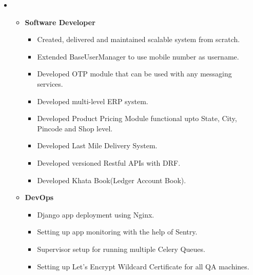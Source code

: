 \documentclass[10.1pt,a4paper,sans]{moderncv}        %
\begin{document}
\begin{itemize}



\item{}
\begin{itemize}

\item \textbf{Software Developer}
\begin{itemize}
\item Created, delivered and maintained scalable system from scratch.
\item Extended BaseUserManager to use mobile number as username.
\item Developed OTP module that can be used with any messaging services.
\item Developed multi-level ERP system.
\item Developed Product Pricing Module functional upto State, City, Pincode and Shop level.
\item Developed Last Mile Delivery System.
\item Developed versioned Restful APIs with DRF.
\item Developed Khata Book(Ledger Account Book).
\end{itemize}

\item \textbf{DevOps}
\begin{itemize}
\item Django app deployment using Nginx.
\item Setting up app monitoring with the help of Sentry.
\item Supervisor setup for running multiple Celery Queues.
\item Setting up Let's Encrypt Wildcard Certificate for all QA machines.
\end{itemize}

\end{itemize}
\vspace{3pt}


\end{itemize}
\end{document}
